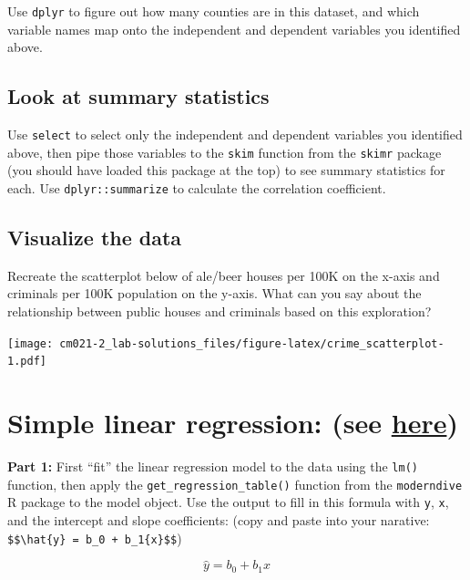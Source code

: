 \documentclass[]{article}
\begin{document}
Use \texttt{dplyr} to figure out how many counties are in this dataset,
and which variable names map onto the independent and dependent
variables you identified above.

\hypertarget{look-at-summary-statistics}{%
\subsection{Look at summary
statistics}\label{look-at-summary-statistics}}

Use \texttt{select} to select only the independent and dependent
variables you identified above, then pipe those variables to the
\texttt{skim} function from the \texttt{skimr} package (you should have
loaded this package at the top) to see summary statistics for each. Use
\texttt{dplyr::summarize} to calculate the correlation coefficient.

\hypertarget{visualize-the-data}{%
\subsection{Visualize the data}\label{visualize-the-data}}

Recreate the scatterplot below of ale/beer houses per 100K on the x-axis
and criminals per 100K population on the y-axis. What can you say about
the relationship between public houses and criminals based on this
exploration?

\texttt{[image: cm021-2\_lab-solutions\_files/figure-latex/crime\_scatterplot-1.pdf]}

\hypertarget{simple-linear-regression-see-here}{%
\section{\texorpdfstring{Simple linear regression: (see
\href{https://moderndive.com/5-regression.html\#model1table}{here})}{Simple linear regression: (see here)}}\label{simple-linear-regression-see-here}}

\textbf{Part 1:} First ``fit'' the linear regression model to the data
using the \texttt{lm()} function, then apply the
\texttt{get\_regression\_table()} function from the \texttt{moderndive}
R package to the model object. Use the output to fill in this formula
with \texttt{y}, \texttt{x}, and the intercept and slope coefficients:
(copy and paste into your narative:
\texttt{\$\$\textbackslash{}hat\{y\}\ =\ b\_0\ +\ b\_1\{x\}\$\$})

\[\hat{y} = b_0 + b_1{x}\]
\end{document}
